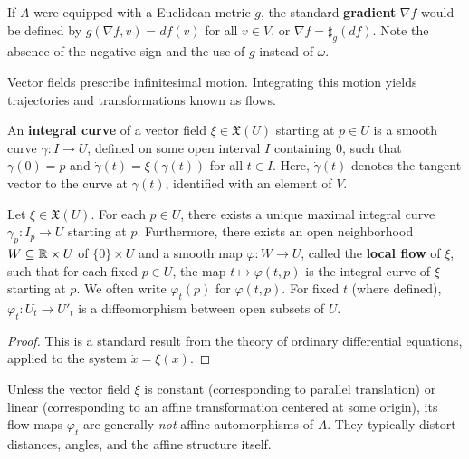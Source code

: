 \begin{example}
If $A$ were equipped with a Euclidean metric $g$, the standard \textbf{gradient} $\nabla f$ would be defined by $g(\nabla f, v) = d f(v)$ for all $v \in V$, or $\nabla f = \sharp_g (d f)$. Note the absence of the negative sign and the use of $g$ instead of $\omega$.
\end{example}

Vector fields prescribe infinitesimal motion. Integrating this motion yields trajectories and transformations known as flows.

\begin{definition}
An \textbf{integral curve} of a vector field $\xi \in \mathfrak{X}(U)$ starting at $p \in U$ is a smooth curve $\gamma: I \to U$, defined on some open interval $I$ containing $0$, such that $\gamma(0) = p$ and $\dot{\gamma}(t) = \xi(\gamma(t))$ for all $t \in I$. Here, $\dot{\gamma}(t)$ denotes the tangent vector to the curve at $\gamma(t)$, identified with an element of $V$.
\end{definition}

\begin{theorem}
Let $\xi \in \mathfrak{X}(U)$. For each $p \in U$, there exists a unique maximal integral curve $\gamma_p: I_p \to U$ starting at $p$. Furthermore, there exists an open neighborhood $W \subseteq \mathbb{R} \times U$ of $\{0\} \times U$ and a smooth map $\varphi: W \to U$, called the \textbf{local flow} of $\xi$, such that for each fixed $p \in U$, the map $t \mapsto \varphi(t, p)$ is the integral curve of $\xi$ starting at $p$. We often write $\varphi_t(p)$ for $\varphi(t, p)$. For fixed $t$ (where defined), $\varphi_t: U_t \to U'_t$ is a diffeomorphism between open subsets of $U$.
\end{theorem}
\begin{proof}
This is a standard result from the theory of ordinary differential equations, applied to the system $\dot{x} = \xi(x)$.
\end{proof}

\begin{remark}
Unless the vector field $\xi$ is constant (corresponding to parallel translation) or linear (corresponding to an affine transformation centered at some origin), its flow maps $\varphi_t$ are generally \textit{not} affine automorphisms of $A$. They typically distort distances, angles, and the affine structure itself.
\end{remark}

